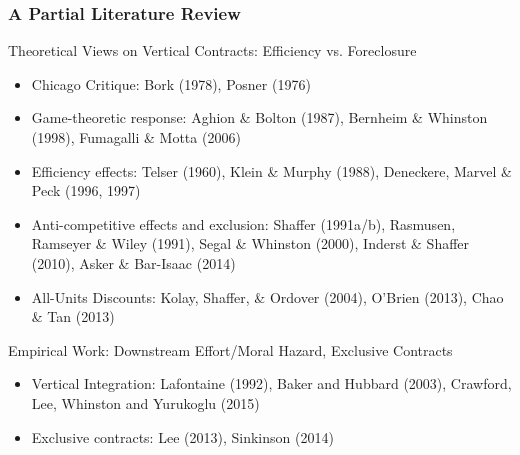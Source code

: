 \begin{frame}
\frametitle{A Partial Literature Review}
\small
Theoretical Views on Vertical Contracts: Efficiency vs. Foreclosure
\footnotesize
\begin{itemize}
\item Chicago Critique: Bork (1978), Posner (1976)
\item Game-theoretic response: Aghion \& Bolton (1987), Bernheim \& Whinston (1998), Fumagalli \& Motta (2006)
\item Efficiency effects: Telser (1960), Klein \& Murphy (1988), Deneckere, Marvel \& Peck (1996, 1997)
\item Anti-competitive effects and exclusion: Shaffer (1991a/b), Rasmusen, Ramseyer \& Wiley (1991), Segal \& Whinston (2000), Inderst \& Shaffer (2010), Asker \& Bar-Isaac (2014)
\item All-Units Discounts: Kolay, Shaffer, \& Ordover (2004), O'Brien (2013), Chao \& Tan (2013)
\end{itemize}
\small
Empirical Work: Downstream Effort/Moral Hazard, Exclusive Contracts
\footnotesize
\begin{itemize}
\item Vertical Integration: Lafontaine (1992), Baker and Hubbard (2003), Crawford, Lee, Whinston and Yurukoglu (2015)
\item Exclusive contracts: Lee (2013), Sinkinson (2014)
\end{itemize}
\end{frame}




